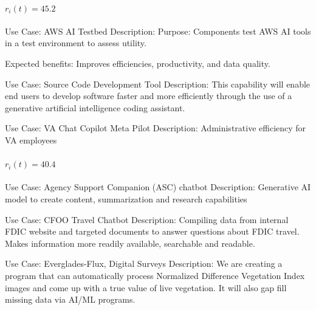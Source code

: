 \paragraph{$r_i(t) = 45.2$}
\begin{description}[style=nextline,leftmargin=1em,font=\normalfont\bfseries]
  \item[Anchor] Use Case: AWS AI Testbed
Description: Purpose: Components test AWS AI tools in a test environment to assess utility. 

Expected benefits: Improves efficiencies, productivity, and data quality.
  \item[Human-judged closer] Use Case: Source Code Development Tool
Description: This capability will enable end users to develop software faster and more efficiently through the use of a generative artificial intelligence coding assistant.  

  \item[Human-judged farther] Use Case: VA Chat Copilot Meta Pilot
Description: Administrative efficiency for VA employees 
\end{description}
\paragraph{$r_i(t) = 40.4$}
\begin{description}[style=nextline,leftmargin=1em,font=\normalfont\bfseries]
  \item[Anchor] Use Case: Agency Support Companion (ASC) chatbot
Description: Generative AI model to create content, summarization and research capabilities
  \item[Human-judged closer] Use Case: CFOO Travel Chatbot
Description: Compiling data from internal FDIC website and targeted documents to answer questions about FDIC travel. Makes information more readily available, searchable and readable.
  \item[Human-judged farther] Use Case: Everglades-Flux, Digital Surveys
Description: We are creating a program that can automatically process Normalized Difference Vegetation Index images and come up with a true value of live vegetation. It will also gap fill missing data via AI/ML programs.
\end{description}
